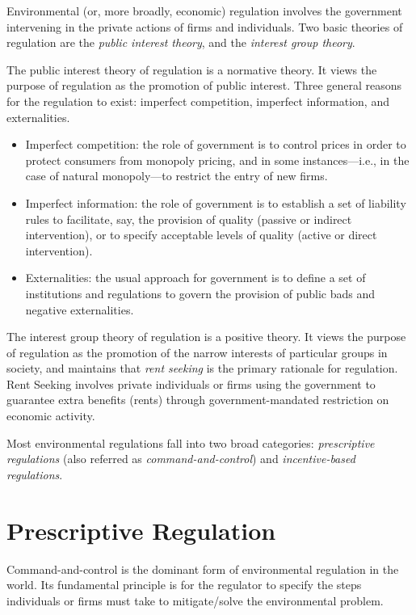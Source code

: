 \documentclass[
]{book}
\providecommand{\tightlist}{%
  \setlength{\itemsep}{0pt}\setlength{\parskip}{0pt}}
\begin{document}
Environmental (or, more broadly, economic) regulation involves the government intervening in the private actions of firms and individuals. Two basic theories of regulation are the \emph{public interest theory}, and the \emph{interest group theory}.

The public interest theory of regulation is a normative theory. It views the purpose of regulation as the promotion of public interest. Three general reasons for the regulation to exist: imperfect competition, imperfect information, and externalities.

\begin{itemize}
\tightlist
\item
  Imperfect competition: the role of government is to control prices in order to protect consumers from monopoly pricing, and in some instances---i.e., in the case of natural monopoly---to restrict the entry of new firms.
\item
  Imperfect information: the role of government is to establish a set of liability rules to facilitate, say, the provision of quality (passive or indirect intervention), or to specify acceptable levels of quality (active or direct intervention).
\item
  Externalities: the usual approach for government is to define a set of institutions and regulations to govern the provision of public bads and negative externalities.
\end{itemize}

The interest group theory of regulation is a positive theory. It views the purpose of regulation as the promotion of the narrow interests of particular groups in society, and maintains that \emph{rent seeking} is the primary rationale for regulation. Rent Seeking involves private individuals or firms using the government to guarantee extra benefits (rents) through government-mandated restriction on economic activity.

Most environmental regulations fall into two broad categories: \emph{prescriptive regulations} (also referred as \emph{command-and-control}) and \emph{incentive-based regulations}.

\hypertarget{prescriptive-regulation}{%
\section{Prescriptive Regulation}\label{prescriptive-regulation}}

Command-and-control is the dominant form of environmental regulation in the world. Its fundamental principle is for the regulator to specify the steps individuals or firms must take to mitigate/solve the environmental problem.
\end{document}
